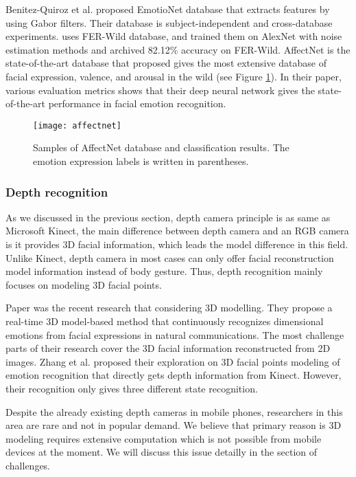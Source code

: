 Benitez-Quiroz et al. \cite{fabian2016emotionet} proposed EmotioNet database that extracts features by using Gabor filters. Their database is subject-independent and cross-database experiments.
\cite{mollahosseini2016facial} uses FER-Wild database, and trained them on AlexNet with noise estimation methods and archived 82.12\% accuracy on FER-Wild. 
AffectNet \cite{Mollahosseini2017} is the state-of-the-art database that proposed gives the most extensive database of facial expression, valence, and arousal in the wild (see Figure \ref{fig:affectnet}). In their paper, various evaluation metrics shows that their deep neural network gives the state-of-the-art performance in facial emotion recognition.

\begin{figure}
  \centering
  \texttt{[image: affectnet]}
  \caption{Samples of AffectNet database and classification results. The emotion expression labels is written in parentheses.}
  \label{fig:affectnet}
\end{figure}

\subsubsection{Depth recognition}

As we discussed in the previous section, depth camera principle is as same as Microsoft Kinect, the main difference between depth camera and an RGB camera is it provides 3D facial information, which leads the model difference in this field. Unlike Kinect, depth camera in most cases can only offer facial reconstruction model information instead of body gesture. Thus, depth recognition mainly focuses on modeling 3D facial points. 

Paper \cite{chen20153d} was the recent research that considering 3D modelling. They propose a real-time 3D model-based method that continuously recognizes dimensional emotions from facial expressions in natural communications. The most challenge parts of their research cover the 3D facial information reconstructed from 2D images. Zhang et al. \cite{zhang2016emotion} proposed their exploration on 3D facial points modeling of emotion recognition that directly gets depth information from Kinect. However, their recognition only gives three different state recognition.

Despite the already existing depth cameras in mobile phones, researchers in this area are rare and not in popular demand. We believe that primary reason is 3D modeling requires extensive computation which is not possible from mobile devices at the moment. We will discuss this issue detailly in the section of challenges.

